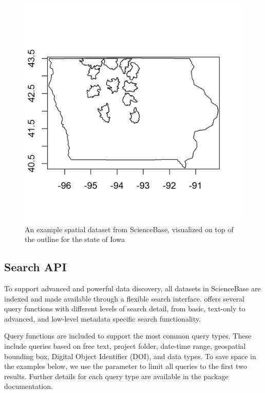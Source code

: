  \begin{figure}[htbp]
   \centering
   \includegraphics{mapfig}
   \caption{An example spatial dataset from ScienceBase,
   visualized on top of the outline for the state of Iowa}
   \label{figure:iowafig}
 \end{figure}


\subsection{Search API}
To support advanced and powerful data discovery, all datasets
in ScienceBase are indexed and made available through a flexible
search interface.  offers several query
functions with different levels of search detail, from
basic, text-only to advanced, and low-level metadata specific search
functionality.

Query functions are included to support the most common query types. These
include queries based on free text, project folder, date-time range, geospatial
bounding box, Digital Object Identifier (DOI), and data types. To save space in
the examples below, we use the  parameter to limit all queries to
the first two results. Further details for each query type are available in the
package documentation.


